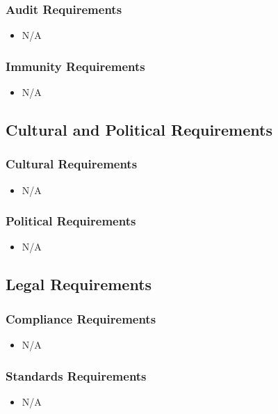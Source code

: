 \documentclass [12pt]{article}
\begin{document}
\subsubsection{Audit  Requirements }
	\begin{itemize}
		\item N/A
	\end{itemize} 

\subsubsection{Immunity Requirements  }
	\begin{itemize}
		\item N/A
	\end{itemize}

\subsection{Cultural and Political Requirements } 
\subsubsection{Cultural Requirements }
	\begin{itemize}
		\item N/A
	\end{itemize}

\subsubsection{Political Requirements }
	\begin{itemize}
		\item N/A
	\end{itemize}


\subsection{Legal Requirements}
\subsubsection{Compliance Requirements }
	\begin{itemize}
		\item N/A
	\end{itemize}
	
\subsubsection{Standards Requirements }
	\begin{itemize}
		\item N/A
	\end{itemize}
\end{document}
